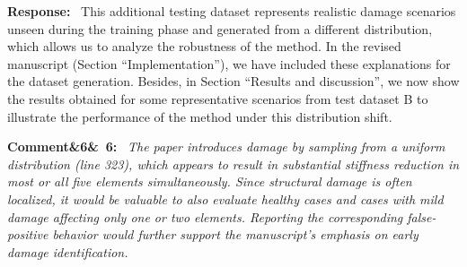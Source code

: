 \documentclass[11pt]{article}
\newenvironment{rcomment}[1]{\par\bigskip\noindent\textbf{Comment\ifx&#1&\else\ #1\fi:}\ \itshape}{\par}
\newenvironment{response}{\par\smallskip\noindent\color{resp}\textbf{Response:}\ }{\par}
\newcommand{\z}{\mathbf{z}}
\begin{document}
\begin{response}
This additional testing dataset represents realistic damage scenarios unseen during the training phase and generated from a different distribution, which allows us to analyze the robustness of the method. 
In the revised manuscript (Section ``Implementation''), we have included these explanations for the dataset generation. 
Besides, in Section ``Results and discussion'', we now show the results obtained for some representative scenarios from test dataset B to illustrate the performance of the method under this distribution shift. 

\end{response}



 

\begin{rcomment}{6}
The paper introduces damage by sampling from a uniform distribution (line 323), which appears to result in substantial
stiffness reduction in most or all five elements simultaneously. Since structural damage is often localized, it would be
valuable to also evaluate healthy cases and cases with mild damage affecting only one or two elements. Reporting the
corresponding false-positive behavior would further support the manuscript's emphasis on early damage identification.
\end{rcomment}
\end{document}
